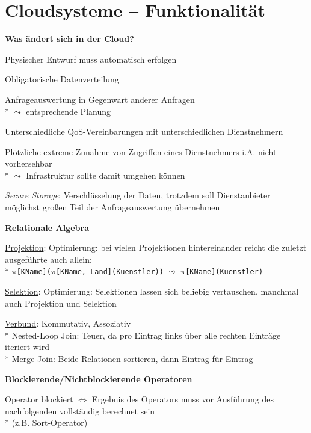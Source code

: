 \section{Cloudsysteme -- Funktionalität}
\label{sec:cloudfunktionalitaet}

\textbf{Was ändert sich in der Cloud?}
\begin{items}
	\item Physischer Entwurf muss automatisch erfolgen
	\item Obligatorische Datenverteilung
	\item Anfrageauswertung in Gegenwart anderer Anfragen
		\\*
		\( \leadsto \) entsprechende Planung
	\item Unterschiedliche QoS-Vereinbarungen mit unterschiedlichen Dienstnehmern
	\item Plötzliche extreme Zunahme von Zugriffen eines Dienstnehmers i.A. nicht vorhersehbar 
		\\*
		\( \leadsto \) Infrastruktur sollte damit umgehen können
	\item \emph{Secure Storage}: Verschlüsselung der Daten, trotzdem soll Dienstanbieter möglichst großen Teil der Anfrageauswertung übernehmen
\end{items}

\textbf{Relationale Algebra}
\begin{items}
	\item \underline{Projektion}: Optimierung: bei vielen Projektionen hintereinander reicht die zuletzt ausgeführte auch allein:
		\\*
		\( \pi \)\lstinline{[KName](}\( \pi \)\lstinline{[KName, Land](Kuenstler))} \( \leadsto \) \( \pi \)\lstinline{[KName](Kuenstler)}
	\item \underline{Selektion}: Optimierung: Selektionen lassen sich beliebig vertauschen, manchmal auch Projektion und Selektion
	\item \underline{Verbund}: Kommutativ, Assoziativ
		\\*
		Nested-Loop Join: Teuer, da pro Eintrag links über alle rechten Einträge iteriert wird
		\\*
		Merge Join: Beide Relationen sortieren, dann Eintrag für Eintrag
\end{items}

\textbf{Blockierende/Nichtblockierende Operatoren}
\begin{items}
	\item Operator blockiert \( \Leftrightarrow \) Ergebnis des Operators muss vor Ausführung des nachfolgenden vollständig berechnet sein \\* (z.B. Sort-Operator)
\end{items}

